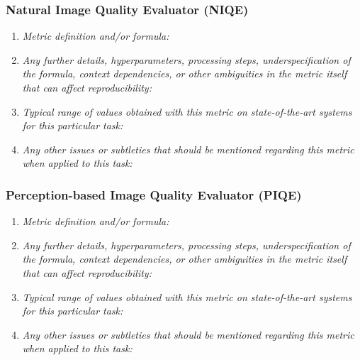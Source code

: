 \documentclass[a4paper,11pt]{article}
\begin{document}
        \subsubsection{Natural Image Quality Evaluator (NIQE)}
            \begin{enumerate}[label=\alph*.]
                \item \textit{Metric definition and/or formula:}
                \bigskip
                \item \textit{Any further details, hyperparameters, processing steps, underspecification of the formula, context dependencies, or other ambiguities in the metric itself that can affect reproducibility:}
                \bigskip
                \item \textit{Typical range of values obtained with this metric on state-of-the-art systems for this particular task:}
                \bigskip
                \item \textit{Any other issues or subtleties that should be mentioned regarding this metric when applied to this task:}
                \bigskip
            \end{enumerate}
        \subsubsection{Perception-based Image Quality Evaluator (PIQE)}
            \begin{enumerate}[label=\alph*.]
                \item \textit{Metric definition and/or formula:}
                \bigskip
                \item \textit{Any further details, hyperparameters, processing steps, underspecification of the formula, context dependencies, or other ambiguities in the metric itself that can affect reproducibility:}
                \bigskip
                \item \textit{Typical range of values obtained with this metric on state-of-the-art systems for this particular task:}
                \bigskip
                \item \textit{Any other issues or subtleties that should be mentioned regarding this metric when applied to this task:}
                \bigskip
            \end{enumerate}
\end{document}
